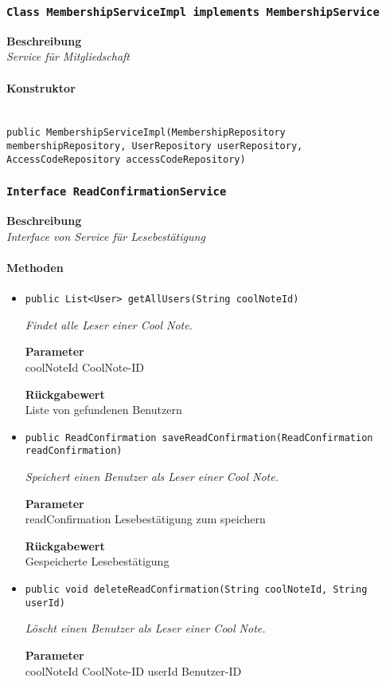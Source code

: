     \subsubsection{\texttt{Class MembershipServiceImpl implements MembershipService}}
    \textbf{Beschreibung} \\
    \textit{Service für Mitgliedschaft}
    \paragraph*{Konstruktor}\mbox{} \\
    \texttt{public MembershipServiceImpl(MembershipRepository membershipRepository, UserRepository userRepository, AccessCodeRepository accessCodeRepository)} \\
    \subsubsection{\texttt{Interface ReadConfirmationService}}
    \textbf{Beschreibung} \\
    \textit{Interface von Service für Lesebestätigung}
    \paragraph*{Methoden}
    \begin{itemize}
    	\item{\texttt{public List<User> getAllUsers(String coolNoteId)}}
    	
    	\textit{Findet alle Leser einer Cool Note.}
    	
    	\textbf{Parameter} \\
    	coolNoteId CoolNote-ID
    	
    	\textbf{Rückgabewert} \\
    	Liste von gefundenen Benutzern        \item{\texttt{public ReadConfirmation saveReadConfirmation(ReadConfirmation readConfirmation)}}
    	
    	\textit{Speichert einen Benutzer als Leser einer Cool Note.}
    	
    	\textbf{Parameter} \\
    	readConfirmation Lesebestätigung zum speichern
    	
    	\textbf{Rückgabewert} \\
    	Gespeicherte Lesebestätigung        \item{\texttt{public void deleteReadConfirmation(String coolNoteId, String userId)}}
    	
    	\textit{Löscht einen Benutzer als Leser einer Cool Note.}
    	
    	\textbf{Parameter} \\
    	coolNoteId CoolNote-ID
    	userId Benutzer-ID
    	
    	
    \end{itemize}
